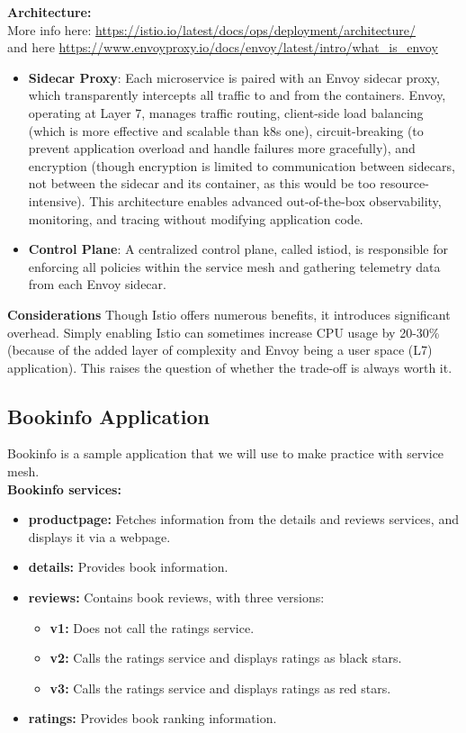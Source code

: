\documentclass{article}
\begin{document}
\textbf{Architecture:} \\
More info here: \footnotesize\url{https://istio.io/latest/docs/ops/deployment/architecture/} \\
and here \footnotesize\url{https://www.envoyproxy.io/docs/envoy/latest/intro/what_is_envoy}
\normalsize
\begin{itemize}
    \item \textbf{Sidecar Proxy}: Each microservice is paired with an Envoy sidecar proxy, which transparently intercepts all traffic to and from the containers. Envoy, operating at Layer 7, manages traffic routing, client-side load balancing (which is more effective and scalable than k8s one), circuit-breaking (to prevent application overload and handle failures more gracefully), and encryption (though encryption is limited to communication between sidecars, not between the sidecar and its container, as this would be too resource-intensive). This architecture enables advanced out-of-the-box observability, monitoring, and tracing without modifying application code. 
    \item \textbf{Control Plane}: A centralized control plane, called istiod, is responsible for enforcing all policies within the service mesh and gathering telemetry data from each Envoy sidecar.
\end{itemize}

\textbf{Considerations}
Though Istio offers numerous benefits, it introduces significant overhead. Simply enabling Istio can sometimes increase CPU usage by 20-30\% (because of the added layer of complexity and Envoy being a user space (L7) application). This raises the question of whether the trade-off is always worth it.

\subsection{Bookinfo Application}
Bookinfo is a sample application that we will use to make practice with service mesh.\\

\textbf{Bookinfo services:}
\begin{itemize}
    \item \textbf{productpage:} Fetches information from the details and reviews services, and displays it via a webpage.
    \item \textbf{details:} Provides book information.
    \item \textbf{reviews:} Contains book reviews, with three versions:
    \begin{itemize}
        \item \textbf{v1:} Does not call the ratings service.
        \item \textbf{v2:} Calls the ratings service and displays ratings as black stars.
        \item \textbf{v3:} Calls the ratings service and displays ratings as red stars.
    \end{itemize}
    \item \textbf{ratings:} Provides book ranking information.
\end{itemize}
\end{document}
